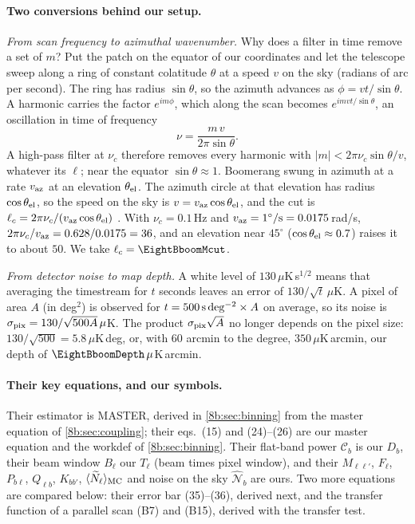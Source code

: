 \paragraph{Two conversions behind our setup.}
\emph{From scan frequency to azimuthal wavenumber.} Why does a filter in time remove a set of $m$? Put
the patch on the equator of our coordinates and let the telescope sweep along a ring of constant
colatitude $\theta$ at a speed $v$ on the sky (radians of arc per second). The ring has radius $\sin\theta$, so
the azimuth advances as $\phi=vt/\sin\theta$. A harmonic carries the factor $e^{im\phi}$, which along the scan
becomes $e^{imvt/\sin\theta}$, an oscillation in time of frequency
\[
  \nu=\frac{m\,v}{2\pi\sin\theta} .
\]
A high-pass filter at $\nu_c$ therefore removes every harmonic with $|m|<2\pi\nu_c\sin\theta/v$, whatever its $\ell$;
near the equator $\sin\theta\approx1$. Boomerang swung in azimuth at a rate $v_{\rm az}$ at an elevation $\theta_{\rm el}$. The
azimuth circle at that elevation has radius $\cos\theta_{\rm el}$, so the speed on the sky is $v=v_{\rm az}\cos\theta_{\rm el}$,
and the cut is $\ell_c=2\pi\nu_c/(v_{\rm az}\cos\theta_{\rm el})$ . With $\nu_c=0.1$\,Hz and
$v_{\rm az}=1^\circ/{\rm s}=0.0175$\,rad/s, $2\pi\nu_c/v_{\rm az}=0.628/0.0175=36$, and an elevation near $45^\circ$
($\cos\theta_{\rm el}\approx0.7$) raises it to about $50$. We take $\ell_c=\EightBboomMcut$.

\emph{From detector noise to map depth.} A white level of $130\,\mu$K\,s$^{1/2}$ means that averaging the
timestream for $t$ seconds leaves an error of $130/\sqrt t\,\mu$K. A pixel of area $A$ (in deg$^2$) is observed
for $t=500\,{\rm s\,deg^{-2}}\times A$ on average, so its noise is $\sigma_{\rm pix}=130/\sqrt{500A}\,\mu$K. The product
$\sigma_{\rm pix}\sqrt A$ no longer depends on the pixel size: $130/\sqrt{500}=5.8\,\mu$K\,deg, or, with $60$ arcmin to the
degree, $350\,\mu$K\,arcmin, our depth of $\EightBboomDepth\,\mu$K\,arcmin.

\paragraph{Their key equations, and our symbols.}
Their estimator is MASTER, derived in \cref{8b:sec:binning} from the master equation of
\cref{8b:sec:coupling}; their eqs.~(15) and (24)--(26) are our master equation and the workdef of
\cref{8b:sec:binning}. Their flat-band power $\mathcal C_b$ is our $D_b$, their beam window $B_\ell$ our $T_\ell$
(beam times pixel window), and their $M_{\ell\ell'}$, $F_\ell$, $P_{b\ell}$, $Q_{\ell b}$, $K_{bb'}$, $\langle\widetilde N_\ell\rangle_{\rm MC}$ and
noise on the sky $\widehat{\mathcal N}_b$ are ours. Two more equations are compared below: their error bar (35)--(36),
derived next, and the transfer function of a parallel scan (B7) and (B15), derived with the transfer
test.

